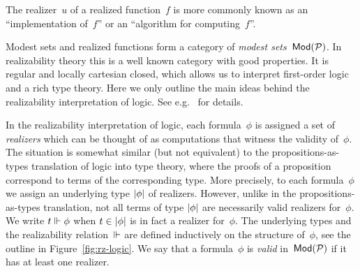The realizer~$u$ of a realized function~$f$ is more commonly known as
an ``implementation of~$f$'' or an ``algorithm for computing~$f$''.

Modest sets and realized functions form a category of \emph{modest
  sets~$\mathsf{Mod}(\mathcal{P})$}. In realizability theory this is a well known
category with good properties. It is regular and locally cartesian
closed, which allows us to interpret first-order logic and a rich type
theory. Here we only outline the main ideas behind the realizability
interpretation of logic. See e.g.~\cite{Bauer:00} for details.

In the realizability interpretation of logic, each formula~$\phi$ is
assigned a set of \emph{realizers} which can be thought of as
computations that witness the validity of~$\phi$. The situation is
somewhat similar (but not equivalent) to the propositions-as-types
translation of logic into type theory, where the proofs of a
proposition correspond to terms of the corresponding type. More
precisely, to each formula~$\phi$ we assign an underlying type
$|\phi|$ of realizers. However, unlike in the propositions-as-types
translation, not all terms of type $|\phi|$ are necessarily valid
realizers for~$\phi$. We write $t \Vdash \phi$ when $t \in |\phi|$ is
in fact a realizer for~$\phi$. The underlying types and the
realizability relation~$\Vdash$ are defined inductively on the structure
of~$\phi$, see the outline in Figure~\ref{fig:rz-logic}. We say that a
formula~$\phi$ is \emph{valid} in~$\mathsf{Mod}(\mathcal{P})$ if it has at least one
realizer.

